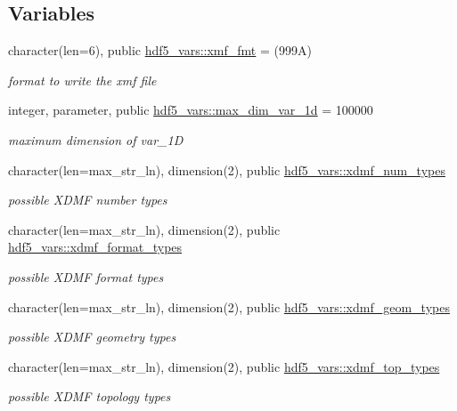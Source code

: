 \subsection*{Variables}
\begin{DoxyCompactItemize}
\item 
character(len=6), public \hyperlink{namespacehdf5__vars_ad8665a0387dde737161d1162565aefa9}{hdf5\+\_\+vars\+::xmf\+\_\+fmt} = \textquotesingle{}(999\+A)\textquotesingle{}
\begin{DoxyCompactList}\small\item\em format to write the xmf file \end{DoxyCompactList}\item 
integer, parameter, public \hyperlink{namespacehdf5__vars_a69c36b36ad7f55ff124ebc328d18adb7}{hdf5\+\_\+vars\+::max\+\_\+dim\+\_\+var\+\_\+1d} = 100000
\begin{DoxyCompactList}\small\item\em maximum dimension of var\+\_\+1D \end{DoxyCompactList}\item 
character(len=max\+\_\+str\+\_\+ln), dimension(2), public \hyperlink{namespacehdf5__vars_ad8c38b66b3e9b402f05e7e7a36415fb3}{hdf5\+\_\+vars\+::xdmf\+\_\+num\+\_\+types}
\begin{DoxyCompactList}\small\item\em possible X\+D\+MF number types \end{DoxyCompactList}\item 
character(len=max\+\_\+str\+\_\+ln), dimension(2), public \hyperlink{namespacehdf5__vars_ab9c0d2270239bf1963c6294ab7198f8c}{hdf5\+\_\+vars\+::xdmf\+\_\+format\+\_\+types}
\begin{DoxyCompactList}\small\item\em possible X\+D\+MF format types \end{DoxyCompactList}\item 
character(len=max\+\_\+str\+\_\+ln), dimension(2), public \hyperlink{namespacehdf5__vars_acabe6ee64c1612c30ab37774678238e5}{hdf5\+\_\+vars\+::xdmf\+\_\+geom\+\_\+types}
\begin{DoxyCompactList}\small\item\em possible X\+D\+MF geometry types \end{DoxyCompactList}\item 
character(len=max\+\_\+str\+\_\+ln), dimension(2), public \hyperlink{namespacehdf5__vars_ad25ea0a5a9a4bb3f9248a7fa61ea1363}{hdf5\+\_\+vars\+::xdmf\+\_\+top\+\_\+types}
\begin{DoxyCompactList}\small\item\em possible X\+D\+MF topology types \end{DoxyCompactList}\item 

\end{DoxyCompactItemize}
